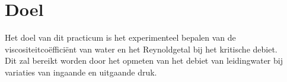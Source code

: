 \section{Doel}

Het doel van dit practicum is het experimenteel bepalen
van de viscositeitco\"effici\"ent van water en het
Reynoldgetal bij het kritische debiet.\\

Dit zal bereikt worden door het opmeten van het debiet van 
leidingwater bij variaties van ingaande en uitgaande 
druk.
